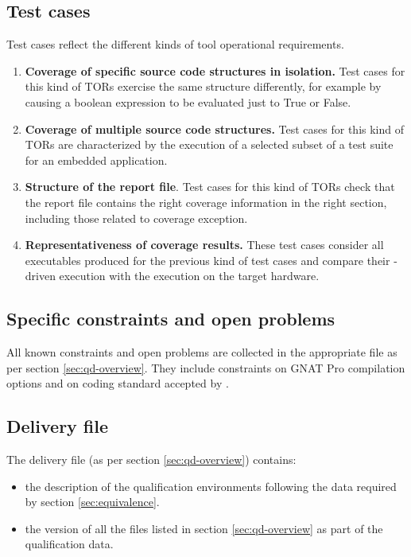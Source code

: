 \documentclass {report}
\begin{document}
\subsection{Test cases}
Test cases reflect the different kinds of tool operational requirements.
\begin{enumerate}

\item \textbf{Coverage of specific source code structures in isolation.} Test cases for this kind of TORs exercise the same structure differently, for example by causing a boolean expression to be evaluated just to True or False.

\item \textbf{Coverage of multiple source code structures.} Test cases for this kind of TORs are characterized by the execution of a selected subset of a test suite for an embedded application. 

\item \textbf{Structure of the report file}. Test cases for this kind of TORs check that the report file contains the right coverage information in the right section, including those related to coverage exception.

\item \textbf{Representativeness of coverage results.} These test cases consider all executables produced for the previous kind of test cases and compare their \xcov-driven execution with the execution on the target hardware. 

\end{enumerate}

\subsection{Specific constraints and open problems}
\label{sec:constr-problems}
All known constraints and open problems are collected in the appropriate file as per section \ref{sec:qd-overview}. They include constraints on GNAT Pro compilation options and on coding standard accepted by \xcov.

\subsection{Delivery file}
\label{sec:delivery}
The delivery file (as per section \ref{sec:qd-overview}) contains:
\begin{itemize} 
\item the description of the qualification environments following the data required by section \ref{sec:equivalence}.
\item the version of all the files listed in section \ref{sec:qd-overview} as part of the qualification data.
\end{itemize}
\end{document}
